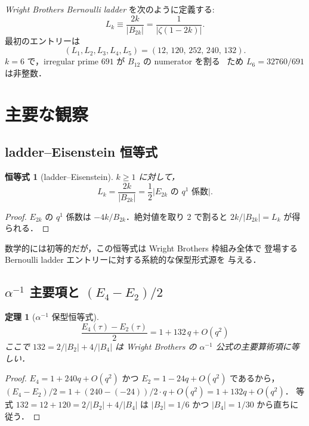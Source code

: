 \documentclass[11pt,a4paper]{article}
\newtheorem{theorem}{定理}
\newtheorem{identity}{恒等式}
\begin{document}
\emph{Wright Brothers Bernoulli ladder} を次のように定義する:
\begin{equation}
L_k \equiv \frac{2k}{|B_{2k}|} = \frac{1}{|\zeta(1-2k)|}.
\end{equation}
最初のエントリーは
\begin{equation}
(L_1, L_2, L_3, L_4, L_5) = (12,\,120,\,252,\,240,\,132).
\end{equation}
$k=6$ で，irregular prime $691$ が $B_{12}$ の numerator を割る
~\cite{Kummer1850}ため $L_6 = 32760/691$ は非整数．

\section{主要な観察}
\label{sec:main}

\subsection{ladder--Eisenstein 恒等式}

\begin{identity}[ladder--Eisenstein]
\label{id:ladder}
$k \geq 1$ に対して，
\begin{equation}
L_k = \frac{2k}{|B_{2k}|} = \frac{1}{2}\bigl|E_{2k}\text{ の }q^1\text{ 係数}\bigr|.
\end{equation}
\end{identity}

\begin{proof}
$E_{2k}$ の $q^1$ 係数は $-4k/B_{2k}$．絶対値を取り 2 で割ると
$2k/|B_{2k}| = L_k$ が得られる．
\end{proof}

数学的には初等的だが，この恒等式は Wright Brothers 枠組み全体で
登場する Bernoulli ladder エントリーに対する系統的な保型形式源を
与える．

\subsection{$\alpha^{-1}$ 主要項と $(E_4 - E_2)/2$}

\begin{theorem}[$\alpha^{-1}$ 保型恒等式]
\label{th:alpha}
\begin{equation}
\frac{E_4(\tau) - E_2(\tau)}{2} = 1 + 132\, q + O(q^2)
\end{equation}
ここで $132 = 2/|B_2| + 4/|B_4|$ は Wright Brothers の $\alpha^{-1}$
公式の主要算術項に等しい．
\end{theorem}

\begin{proof}
$E_4 = 1 + 240q + O(q^2)$ かつ $E_2 = 1 - 24q + O(q^2)$ であるから，
$(E_4 - E_2)/2 = 1 + (240 - (-24))/2 \cdot q + O(q^2) = 1 + 132q + O(q^2)$．
等式 $132 = 12 + 120 = 2/|B_2| + 4/|B_4|$ は $|B_2| = 1/6$ かつ
$|B_4| = 1/30$ から直ちに従う．
\end{proof}
\end{document}
